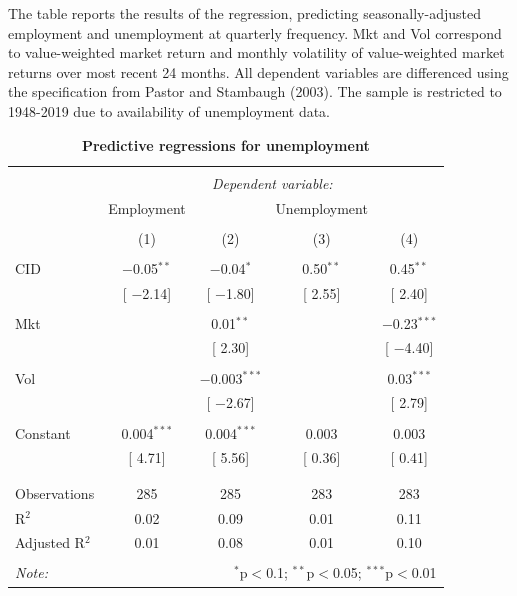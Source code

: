 \documentclass[12pt]{article}
\begin{document}
\begin{table}[!htbp] \centering 
  \caption{\textbf{Predictive regressions for unemployment}}
  \label{} 
      \begin{flushleft}
    {\medskip\small
 The table reports the results of the regression, predicting seasonally-adjusted employment and unemployment at quarterly frequency. Mkt and Vol correspond to value-weighted market return and monthly volatility of value-weighted market returns over most recent 24 months. All dependent variables are differenced using the specification from Pastor and Stambaugh (2003). The sample is restricted to 1948-2019 due to availability of unemployment data.}
    \medskip
    \end{flushleft}
\begin{tabular}{@{\extracolsep{5pt}}lcccc} 
\\[-1.8ex]\hline 
\hline \\[-1.8ex] 
 & \multicolumn{4}{c}{\textit{Dependent variable:}} \\ 
\cline{2-5} 
 & Employment &  & Unemployment &  \\ 
\\[-1.8ex] & (1) & (2) & (3) & (4)\\ 
\hline \\[-1.8ex] 
 CID & $-$0.05$^{**}$ & $-$0.04$^{*}$ & 0.50$^{**}$ & 0.45$^{**}$ \\ 
  & [ $-$2.14] & [ $-$1.80] & [ 2.55] & [ 2.40] \\ 
  & & & & \\ 
 Mkt &  & 0.01$^{**}$ &  & $-$0.23$^{***}$ \\ 
  &  & [ 2.30] &  & [ $-$4.40] \\ 
  & & & & \\ 
 Vol &  & $-$0.003$^{***}$ &  & 0.03$^{***}$ \\ 
  &  & [ $-$2.67] &  & [ 2.79] \\ 
  & & & & \\ 
 Constant & 0.004$^{***}$ & 0.004$^{***}$ & 0.003 & 0.003 \\ 
  & [ 4.71] & [ 5.56] & [ 0.36] & [ 0.41] \\ 
  & & & & \\ 
\hline \\[-1.8ex] 
Observations & 285 & 285 & 283 & 283 \\ 
R$^{2}$ & 0.02 & 0.09 & 0.01 & 0.11 \\ 
Adjusted R$^{2}$ & 0.01 & 0.08 & 0.01 & 0.10 \\ 
\hline 
\hline \\[-1.8ex] 
\textit{Note:}  & \multicolumn{4}{r}{$^{*}$p$<$0.1; $^{**}$p$<$0.05; $^{***}$p$<$0.01} \\ 
\end{tabular} 
\end{table}
\end{document}
